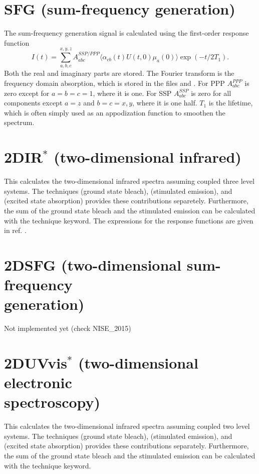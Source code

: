 \section{SFG (sum-frequency generation)}
The sum-frequency generation signal is calculated using the first-order response function \cite{Roy.2014.J.Chem.Phys..141.18C502}
\begin{equation}
		I(t)=\sum_{a,b,c}^{x,y,z}A^{SSP/PPP}_{abc}\langle\alpha_{cb}(t)U(t,0)\mu_{a}(0)\rangle\exp(-t/2T_1).
\end{equation}
Both the real and imaginary parts are stored.
The Fourier transform is the frequency domain absorption, which is stored in the files  and .
For PPP $A^{PPP}_{abc}$ is zero except for $a=b=c=1$, where it is one.
For SSP $A^{SSP}_{abc}$ is zero for all components except $a=z$ and $b=c=x,y$, where it is one half.
$T_1$ is the lifetime, which is often simply used as an appodization function to smoothen the spectrum. 

\section{2DIR$^{*}$ (two-dimensional infrared)}
This calculates the two-dimensional infrared spectra assuming coupled three level systems.
The techniques  (ground state bleach),  (stimulated emission), and  (excited state absorption) provides these contributions separetely.
Furthermore, the sum of the ground state bleach and the stimulated emission can be calculated with the  technique keyword.
The expressions for the response functions are given in ref. \cite{Jansen.2006.JPCB.110.22910}.

\section{2DSFG (two-dimensional sum-frequency\\ generation)}
Not implemented yet (check NISE\_2015)
 
\section{2DUVvis$^{*}$ (two-dimensional electronic\\ spectroscopy)}
This calculates the two-dimensional infrared spectra assuming coupled two level systems.
The techniques  (ground state bleach),  (stimulated emission), and  (excited state absorption) provides these contributions separately.
Furthermore, the sum of the ground state bleach and the stimulated emission can be calculated with the  technique keyword. 


